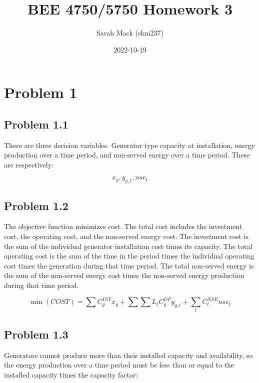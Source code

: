 \documentclass[12pt,a4paper]{article}
\title{ BEE 4750/5750 Homework 3 }
\author{ Sarah Mack (skm237) }
\date{ 2022-10-19 }
\begin{document}
\maketitle





\section{Problem 1}
\subsection{Problem 1.1}
There are three decision variables.  Generator type capacity at installation, energy production over a time period, and non-served energy over a time period. These are respectively:

\[

x_g, y_{g,t}, nse_t

\]
\subsection{Problem 1.2}
The objective function minimizes cost. The total cost includes the investment cost, the operating cost, and the non-served energy cost. The investment cost is the sum of the individual generator installation cost times its capacity. The total operating cost is the sum of the time in the period times the individual operating cost times the generation during that time period. The total non-served energy is the sum of the non-served energy cost times the non-served energy production  during that time period.

\[

\min(COST) = \sum C_g^{INV}x_g + \sum\sum L_t C_g^{OP} y_{g,t} + \sum_t C_t^{NSE} nse_t

\]
\subsection{Problem 1.3}
Generators cannot produce more than their installed capacity and availability, so the energy production over a time period must be less than or equal to the installed capacity times the capacity factor:
\end{document}
